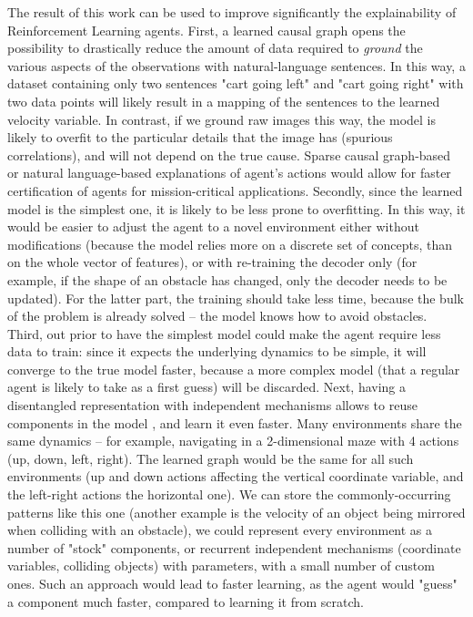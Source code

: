 \documentclass[a4paper,11pt,oneside]{report}
\begin{document}
The result of this work can be used to improve significantly the explainability of Reinforcement Learning agents. First, a learned causal graph opens the possibility to drastically reduce the amount of data required to {\em ground} the various aspects of the observations with natural-language sentences.
In this way, a dataset containing only two sentences "cart going left" and "cart going right" with two data points will likely result in a mapping of the sentences to the learned velocity variable. In contrast, if we ground raw images this way, the model is likely to overfit to the particular details that the image has (spurious correlations), and will not depend on the true cause.
Sparse causal graph-based or natural language-based explanations\cite{Ehsan2018} of agent's actions would allow for faster certification of agents for mission-critical applications.
Secondly, since the learned model is the simplest one, it is likely to be less prone to overfitting. In this way, it would be easier to adjust the agent to a novel environment either without modifications (because the model relies more on a discrete set of concepts, than on the whole vector of features), or with re-training the decoder only (for example, if the shape of an obstacle has changed, only the decoder needs to be updated). For the latter part, the training should take less time, because the bulk of the problem is already solved -- the model knows how to avoid obstacles.
Third, out prior to have the simplest model could make the agent require less data to train: since it expects the underlying dynamics to be simple, it will converge to the true model faster, because a more complex model (that a regular agent is likely to take as a first guess) will be discarded.
Next, having a disentangled representation with independent mechanisms allows to reuse components in the model \cite{Bengio2012}, and learn it even faster. Many environments share the same dynamics -- for example, navigating in a 2-dimensional maze with 4 actions (up, down, left, right). The learned graph would be the same for all such environments (up and down actions affecting the vertical coordinate variable, and the left-right actions the horizontal one). We can store the commonly-occurring patterns like this one (another example is the velocity of an object being mirrored when colliding with an obstacle), we could represent every environment as a number of "stock" components, or recurrent independent mechanisms (coordinate variables, colliding objects) with parameters, with a small number of custom ones. Such an approach would lead to faster learning, as the agent would "guess" a component much faster, compared to learning it from scratch.
\end{document}
